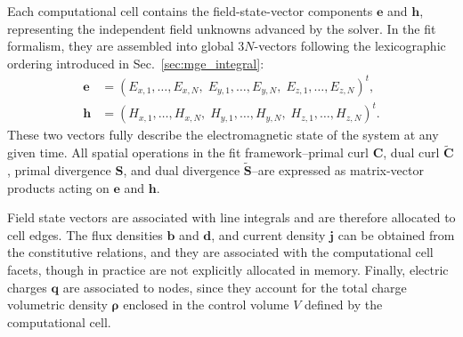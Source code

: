 Each computational cell contains the field-state-vector components $\mathbf{e}$ and $\mathbf{h}$, representing the independent field unknowns advanced by the solver. In the \gls{fit} formalism, they are assembled into global $3N$-vectors following the lexicographic ordering introduced in Sec.~\ref{sec:mge_integral}:
\begin{equation}
\begin{aligned}
\mathbf{e} &= (E_{x,1},\ldots,E_{x,N},\;
E_{y,1},\ldots,E_{y,N},\; E_{z,1},\ldots,E_{z,N})^t, \\[4pt]
\mathbf{h} &= (H_{x,1},\ldots,H_{x,N},\;
H_{y,1},\ldots,H_{y,N},\; H_{z,1},\ldots,H_{z,N})^t.
\end{aligned}
\label{eq:field_vectors}
\end{equation}
These two vectors fully describe the electromagnetic state of the system at any given time. All spatial operations in the \gls{fit} framework--primal curl $\mathbf{C}$, dual curl $\widetilde{\mathbf{C}}$, primal divergence $\mathbf{S}$, and dual divergence $\widetilde{\mathbf{S}}$--are expressed as matrix-vector products acting on $\mathbf{e}$ and $\mathbf{h}$. 

Field state vectors are associated with line integrals and are therefore allocated to cell edges. The flux densities $\mathbf{b}$ and $\mathbf{d}$, and current density $\mathbf{j}$ can be obtained from the constitutive relations, and they are associated with the computational cell facets, though in practice are not explicitly allocated in memory. Finally, electric charges $\mathbf{q}$ are associated to nodes, since they account for the total charge volumetric density $\mathbf{\rho}$ enclosed in the control volume $V$ defined by the computational cell.



